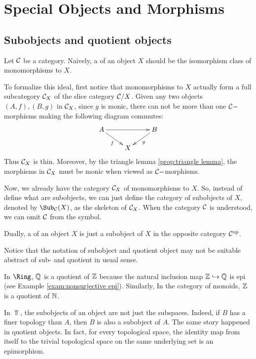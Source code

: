 \chapter{Special Objects and Morphisms}

\minitoc
\newpage
\section{Subobjects and quotient objects}
Let ${\cal C}$ be a category. Naively, a  of an object $X$ should be the isomorphism class of monomorphisms to $X$.

To formalize this ideal, first notice that monomorphisms to $X$ actually form a full subcategory ${\cal C}_X$ of the slice category ${\cal C}/X$. Given any two objects  $(A,f), (B,g)$ in ${\cal C}_X$, since $g$ is monic, there can not be more than one ${\cal C}-$morphisms making the following diagram commutes:
      \begin{displaymath}
        \xymatrix@R=0.5cm{
          A\ar[dr]_f\ar[rr]&&B\ar[dl]^g\\
          &X&
         }
      \end{displaymath}
Thus ${\cal C}_X$ is thin. Moreover, by the triangle lemma \ref{prop:triangle lemma}, the morphisms in ${\cal C}_X$ must be monic when viewed as ${\cal C}-$morphisms.

Now, we already have the category ${\cal C}_X$ of monomorphisms to $X$. So, instead of define what are subobjects, we can just define the category of subobjects of $X$, denoted by $\Sub_{\Cc}(X)$, as the skeleton of ${\cal C}_X$. When the category ${\cal C}$ is understood, we can omit ${\cal C}$ from the symbol.

Dually, a  of an object $X$ is just a subobject of $X$ in the opposite category ${\cal C}^{\operatorname{op}}$.

\begin{rem}
  Notice that the notation of subobject and quotient object may not be suitable abstract of  sub- and quotient in usual sense.
\end{rem}
\begin{exam}
  In $\Ring$, ${\mathbb Q}$ is a quotient of ${\mathbb Z}$ because the natural inclusion map ${\mathbb Z}\hookrightarrow{\mathbb Q}$ is epi (see Example \ref{exam:nonsurjective epi}). Similarly, In the category of monoids, ${\mathbb Z}$ is a quotient of ${\mathbb N}$.
\end{exam}
\begin{exam}
  In $\Top$, the subobjects of an object are not just the subspaces. Indeed, if $B$ has a finer topology than $A$, then $B$ is also a subobject of $A$. The same story happened in quotient objects. In fact, for every topological space, the identity map from itself to the trivial topological space on the same underlying set is an epimorphism.
\end{exam}

